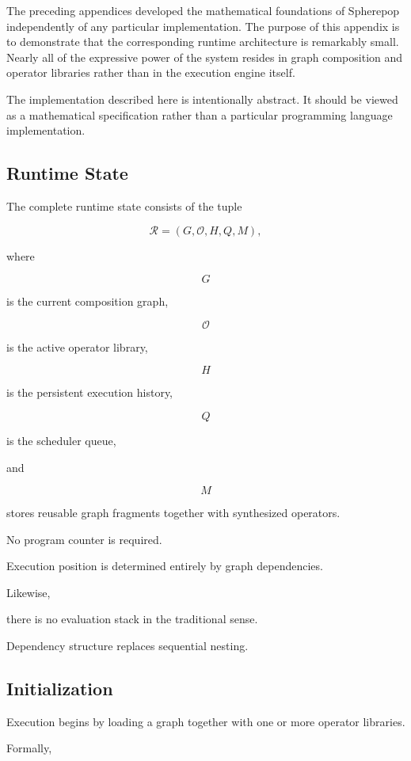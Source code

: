 \documentclass[12pt,oneside]{article}
\begin{document}
The preceding appendices developed the mathematical foundations of Spherepop independently of any particular implementation. The purpose of this appendix is to demonstrate that the corresponding runtime architecture is remarkably small. Nearly all of the expressive power of the system resides in graph composition and operator libraries rather than in the execution engine itself.

The implementation described here is intentionally abstract. It should be viewed as a mathematical specification rather than a particular programming language implementation.

\subsection{Runtime State}

The complete runtime state consists of the tuple

\[
\mathcal R
=
(G,\mathcal O,H,Q,M),
\]

where

\[
G
\]

is the current composition graph,

\[
\mathcal O
\]

is the active operator library,

\[
H
\]

is the persistent execution history,

\[
Q
\]

is the scheduler queue,

and

\[
M
\]

stores reusable graph fragments together with synthesized operators.

No program counter is required.

Execution position is determined entirely by graph dependencies.

Likewise,

there is no evaluation stack in the traditional sense.

Dependency structure replaces sequential nesting.

\subsection{Initialization}

Execution begins by loading a graph together with one or more operator libraries.

Formally,
\end{document}
